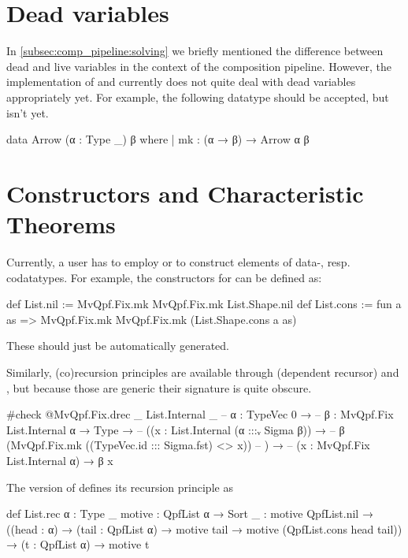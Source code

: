 \section{Dead variables}
In \cref{subsec:comp_pipeline:solving} we briefly mentioned the difference between dead and live
variables in the context of the composition pipeline. However, the implementation of \data{} and \codata{}
currently does not quite deal with dead variables appropriately yet. 
For example, the following datatype should be accepted, but isn't yet.

\begin{badleancode}

  data Arrow (α : Type _) β where
    | mk : (α → β) → Arrow α β

\end{badleancode}


\section{Constructors and Characteristic Theorems}

Currently, a user has to employ  or  to construct elements
of data-, resp. codatatypes. For example, the constructors for  can be defined as:
\begin{leancode}
  def List.nil := MvQpf.Fix.mk MvQpf.Fix.mk List.Shape.nil
  def List.cons := 
    fun a as => MvQpf.Fix.mk MvQpf.Fix.mk (List.Shape.cons a as)
\end{leancode}
These should just be automatically generated.


Similarly, (co)recursion principles are available through  (dependent recursor) 
and , but because those are generic their signature is quite obscure.
\begin{leancode}
  #check @MvQpf.Fix.drec _ List.Internal _
  -- {α : TypeVec 0} →
  --   {β : MvQpf.Fix List.Internal α → Type} →
  --     ((x : List.Internal (α :::ᵥ Sigma β)) → 
  --        β (MvQpf.Fix.mk ((TypeVec.id ::: Sigma.fst) <$$> x))
  --     ) →
  --       (x : MvQpf.Fix List.Internal α) → β x
\end{leancode}

The \inductive{} version of  defines its recursion principle as
\begin{leancode}
  def List.rec {α : Type _} {motive : QpfList α → Sort _} :
  motive QpfList.nil 
    → ((head : α) → (tail : QpfList α) → motive tail → motive (QpfList.cons head tail))
    → (t : QpfList α) 
    → motive t
\end{leancode}

